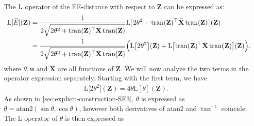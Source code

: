 The $\operatorname{L}$ operator of the EE-distance with respect to $\mathbf{Z}$ can be expressed as:
\begin{align}
    \begin{split}
        \text{L}[\widehat{E}](\mathbf{Z}) &=  \frac{1}{2\sqrt{2\theta^2 + \operatorname{tran}(\mathbf{Z})^\top\bar{\mathbf{X}}\operatorname{tran}(\mathbf{Z})}} \text{L}\bigl[2\theta^2 + \operatorname{tran}(\mathbf{Z})^\top\bar{\mathbf{X}}\operatorname{tran}(\mathbf{Z})\bigr](\mathbf{Z}) \\
        &= \frac{1}{2\sqrt{2\theta^2 + \operatorname{tran}(\mathbf{Z})^\top\bar{\mathbf{X}}\operatorname{tran}(\mathbf{Z})}} \Bigl(\text{L}\bigl[2\theta^2\bigr](\mathbf{Z}) + \text{L}\bigl[\operatorname{tran}(\mathbf{Z})^\top\bar{\mathbf{X}}\operatorname{tran}(\mathbf{Z})\bigr](\mathbf{Z})\Bigr),\!\!\!\!\! \label{eq:explicit-derivative-SE3-LdhatZ-firststep}
    \end{split}
\end{align}
where $\theta, \mathbf{u}$ and $\bar{\mathbf{X}}$ are all functions of $\mathbf{Z}$. We will now analyze the two terms in the operator expression separately. Starting with the first term, we have
\begin{align}
    \text{L}\bigl[2\theta^2\bigr](\mathbf{Z}) = 4\theta \text{L}[\theta](\mathbf{Z}).
\end{align}
As shown in \cref{sec:explicit-construction-SE3}, $\theta$ is expressed as $\theta=\text{atan2}(\sin\theta, \cos\theta)$, however both derivatives of $\text{atan2}$ and $\tan^{-1}$ coincide. The $\text{L}$ operator of $\theta$ is then expressed as

